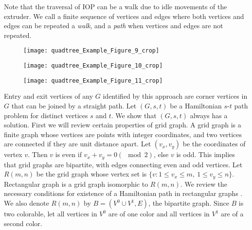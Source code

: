 Note that the traversal of IOP can be a walk due to idle movements of the extruder.
We call a finite sequence of vertices and edges where both vertices and edges can be repeated a {\em walk}, and a {\it path} when vertices and edges are not repeated. 
\begin{figure*}[htp!] 
  \centering
  \begin{subfigure}[t]{1.8in}
    \centering
    \texttt{[image: quadtree\_Example\_Figure\_9\_crop]}
    \caption{\label{fig:celltoura}}
  \end{subfigure}
  \begin{subfigure}[t]{1.8in}
    \centering
    \texttt{[image: quadtree\_Example\_Figure\_10\_crop]}
    \caption{\label{fig:celltourb}}
  \end{subfigure}	
  \begin{subfigure}[t]{1.8in}
    \centering
    \texttt{[image: quadtree\_Example\_Figure\_11\_crop]}
    \caption{\label{fig:celltourc}}
  \end{subfigure}
  \caption{\label{fig:celltour} Black dots in Figure \ref{fig:celltoura} represent entry and exit vertices for each cell from $0$ to $15$, and Hilbert ordering of the cells is in pink.
    Figure \ref{fig:celltourb} shows entry vertex (green dot) and exit vertex (blue dot) for dual graph (red) of pixel graph of each cell.
    Paths shown in pink covers all vertices of dual graphs.
    Figure \ref{fig:celltourc} shows connecting paths in pink which connect paths on dual graphs based on Hilbert ordering of corresponding cells.} 
\end{figure*}


Entry and exit vertices of any $G$ identified by this approach are corner vertices in $G$ that can be joined by a straight path.
Let $(G, s, t)$ be a Hamiltonian $s$-$t$ path problem for  distinct vertices $s$ and $t$.
We show that $(G, s, t)$ always has a solution.
First we will review certain properties of grid graph.
A grid graph is a finite graph whose vertices are points with integer coordinates, and two vertices are connected if they are unit distance apart.
Let $(v_x, v_y)$ be the coordinates of vertex $v$.
Then $v$ is even if $v_x + v_y = 0 (\mod 2)$, else $v$ is odd.
This implies that grid graphs are bipartite, with edges connecting even and odd vertices.
Let $R(m ,n)$ be the grid graph whose vertex set is $\{v: 1 \leq v_x \leq m, ~ 1\leq v_y \leq n \}$.
Rectangular graph is a grid graph isomorphic to $R(m, n)$.
We review the necessary conditions for existence of a Hamiltonian path in rectangular graphs \cite{ItPaSz1982}.
We also denote $R(m,n)$ by $B = (V^0 \cup V^1, E)$, the bipartite graph.
Since $B$ is two colorable, let all vertices in $V^0$ are of one color and all vertices in $V^1$ are of a second color.

